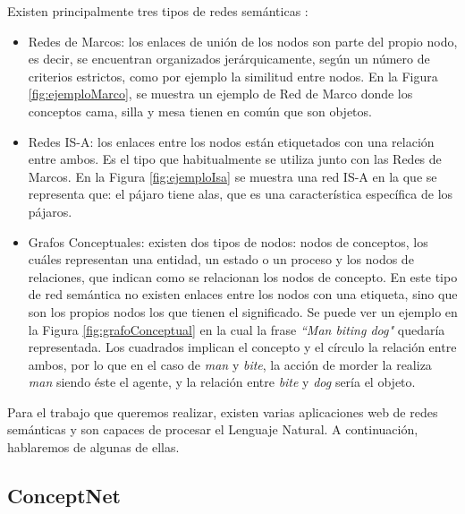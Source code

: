 Existen principalmente tres tipos de redes semánticas \citep{tiposRedesSemanticas}:
\begin{itemize}
	\item Redes de Marcos: los enlaces de unión de los nodos son parte del propio nodo, es decir, se encuentran organizados jerárquicamente, según un número de criterios estrictos, como por ejemplo la similitud entre nodos. En la Figura \ref{fig:ejemploMarco}, se muestra un ejemplo de Red de Marco donde los conceptos cama, silla y mesa tienen en común que son objetos.
	\item Redes IS-A: los enlaces entre los nodos están etiquetados con una relación entre ambos. Es el tipo que habitualmente se utiliza junto con las Redes de Marcos. En la Figura \ref{fig:ejemploIsa} se muestra una red IS-A en la que se representa que: el pájaro tiene alas, que es una característica específica de los pájaros.
	\item Grafos Conceptuales: existen dos tipos de nodos: nodos de conceptos, los cuáles representan una entidad, un estado o un proceso y los nodos de relaciones, que indican como se relacionan los nodos de concepto. En este tipo de red semántica no existen enlaces entre los nodos con una etiqueta, sino que son los propios nodos los que tienen el significado. Se puede ver un ejemplo en la Figura \ref{fig:grafoConceptual} \citep{osti_5673179} en la cual la frase \textit{``Man biting dog"} quedaría representada. Los cuadrados implican el concepto y el círculo la relación entre ambos, por lo que en el caso de \textit{man} y \textit{bite}, la acción de morder la realiza \textit{man} siendo éste el agente, y la relación entre \textit{bite} y \textit{dog} sería el objeto.
\end{itemize}
Para el trabajo que queremos realizar, existen varias aplicaciones web de redes semánticas y son capaces de procesar el Lenguaje Natural.  A continuación, hablaremos de algunas de ellas.

\subsection{ConceptNet} 
\label{cap:subsec:concepnet}

